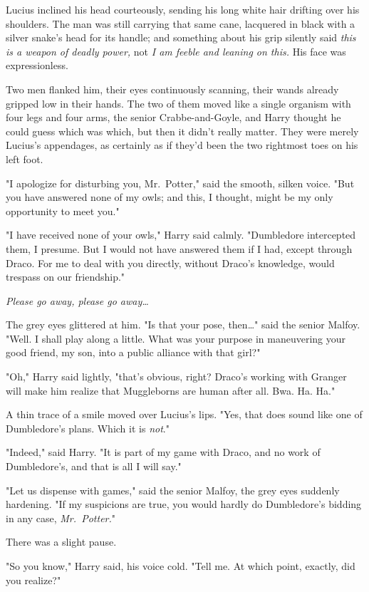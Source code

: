 Lucius inclined his head courteously, sending his long white hair drifting over 
his shoulders. The man was still carrying that same cane, lacquered in black 
with a silver snake's head for its handle; and something about his grip 
silently said \emph{this is a weapon of deadly power,} not \emph{I am feeble 
and leaning on this.} His face was expressionless.

Two men flanked him, their eyes continuously scanning, their wands already 
gripped low in their hands. The two of them moved like a single organism with 
four legs and four arms, the senior Crabbe-and-Goyle, and Harry thought he 
could guess which was which, but then it didn't really matter. They were merely 
Lucius's appendages, as certainly as if they'd been the two rightmost toes on 
his left foot.

"I apologize for disturbing you, Mr.~Potter," said the smooth, silken voice. 
"But you have answered none of my owls; and this, I thought, might be my only 
opportunity to meet you."

"I have received none of your owls," Harry said calmly. "Dumbledore intercepted 
them, I presume. But I would not have answered them if I had, except through 
Draco. For me to deal with you directly, without Draco's knowledge, would 
trespass on our friendship."

\emph{Please go away, please go away{\ldots}}

The grey eyes glittered at him. "Is that your pose, then{\ldots}" said the 
senior Malfoy. "Well. I shall play along a little. What was your purpose in 
maneuvering your good friend, my son, into a public alliance with that girl?"

"Oh," Harry said lightly, "that's obvious, right? Draco's working with Granger 
will make him realize that Muggleborns are human after all. Bwa. Ha. Ha."

A thin trace of a smile moved over Lucius's lips. "Yes, that does sound like 
one of Dumbledore's plans. Which it is \emph{not}."

"Indeed," said Harry. "It is part of my game with Draco, and no work of 
Dumbledore's, and that is all I will say."

"Let us dispense with games," said the senior Malfoy, the grey eyes suddenly 
hardening. "If my suspicions are true, you would hardly do Dumbledore's bidding 
in any case, \emph{Mr.~Potter.}"

There was a slight pause.

"So you know," Harry said, his voice cold. "Tell me. At which point, exactly, 
did you realize?"


